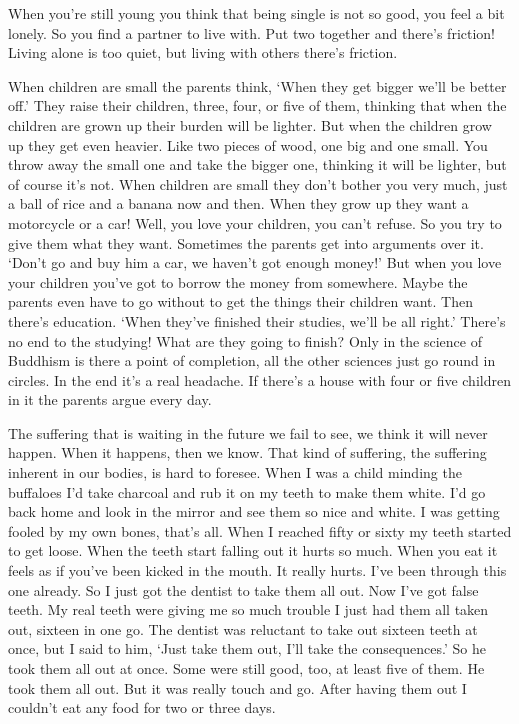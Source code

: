 When you're still young you think that being single is not so good, you feel a bit lonely. So you find a partner to live with. Put two together and there's friction! Living alone is too quiet, but living with others there's friction.

When children are small the parents think, `When they get bigger we'll be better off.' They raise their children, three, four, or five of them, thinking that when the children are grown up their burden will be lighter. But when the children grow up they get even heavier. Like two pieces of wood, one big and one small. You throw away the small one and take the bigger one, thinking it will be lighter, but of course it's not. When children are small they don't bother you very much, just a ball of rice and a banana now and then. When they grow up they want a motorcycle or a car! Well, you love your children, you can't refuse. So you try to give them what they want. Sometimes the parents get into arguments over it. `Don't go and buy him a car, we haven't got enough money!' But when you love your children you've got to borrow the money from somewhere. Maybe the parents even have to go without to get the things their children want. Then there's education. `When they've finished their studies, we'll be all right.' There's no end to the studying! What are they going to finish? Only in the science of Buddhism is there a point of completion, all the other sciences just go round in circles. In the end it's a real headache. If there's a house with four or five children in it the parents argue every day.

The suffering that is waiting in the future we fail to see, we think it will never happen. When it happens, then we know. That kind of suffering, the suffering inherent in our bodies, is hard to foresee. When I was a child minding the buffaloes I'd take charcoal and rub it on my teeth to make them white. I'd go back home and look in the mirror and see them so nice and white. I was getting fooled by my own bones, that's all. When I reached fifty or sixty my teeth started to get loose. When the teeth start falling out it hurts so much. When you eat it feels as if you've been kicked in the mouth. It really hurts. I've been through this one already. So I just got the dentist to take them all out. Now I've got false teeth. My real teeth were giving me so much trouble I just had them all taken out, sixteen in one go. The dentist was reluctant to take out sixteen teeth at once, but I said to him, `Just take them out, I'll take the consequences.' So he took them all out at once. Some were still good, too, at least five of them. He took them all out. But it was really touch and go. After having them out I couldn't eat any food for two or three days.

